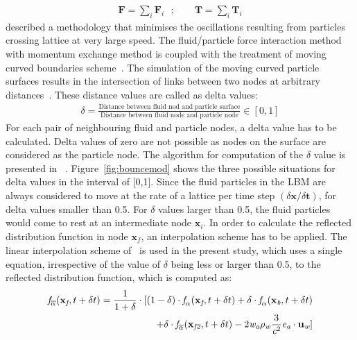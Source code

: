 \begin{align}
\mathbf{F} = \sum\limits_{\textit{i}}{\mathbf{F}_{\textit{i}}} \mbox{ }; \qquad \mathbf{T} = \sum\limits_{\textit{i}}{\mathbf{T}_{\textit{i}}}
\end{align}
\citet{Ladd2001} described a methodology that minimises the oscillations resulting from particles crossing lattice at very large speed. The fluid/particle force interaction method with momentum exchange method is coupled with the treatment of moving curved boundaries scheme~\citep{yu2002unified,yu2003viscous}. The simulation of the moving curved particle surfaces results in the intersection of links between two nodes at arbitrary distances~\citep{iglberger2008}. These distance values are called as delta values:
\begin{align}
\delta = \frac{\mbox{Distance between fluid nod and particle surface}}{\mbox{Distance between fluid node and particle node}} \in [0,1]
\end{align} 
For each pair of neighbouring fluid and particle nodes, a delta value has to be calculated. Delta values of zero are not possible as nodes on the surface are considered as the particle node. The algorithm for computation of the $\delta$ value is presented in ~\citet{iglberger2008}. Figure~\ref{fig:bouncemod} shows the three possible situations for delta values in the interval of [0,1]. Since the fluid particles in the LBM are always considered to move at the rate of a lattice per time step $(\delta \mathbf{x}/ \delta \mathbf{t})$, for delta values smaller than 0.5. For $\delta$ values larger than 0.5, the fluid particles would come to rest at an intermediate node $\mathbf{x}_{\textit{i}}$. In order to calculate the reflected distribution function in node $\mathbf{x}_{\textit{f}}$, an interpolation scheme has to be applied. The linear interpolation scheme of~\citet{yu2002unified, yu2003viscous} is used in the present study, which uses a single equation, irrespective of the value of $\delta$ being less or larger than 0.5, to the reflected distribution function, which is computed as:
\begin{align}
 \nonumber
\textit{\textit{f}}_{\overline{\alpha}}(\mathbf{x}_{\textit{f}},t + \delta t) = \frac{1}{1 + \delta} \cdot [(1-\delta)\cdot \textit{\textit{f}}_{\alpha}(\mathbf{x}_{\textit{f}},t + \delta t) + \delta \cdot \textit{\textit{f}}_{\alpha}(\mathbf{x}_{\textit{b}},t + \delta t)  \\
+ \delta \cdot \textit{\textit{f}}_{\overline{\alpha}}(\mathbf{x}_{\textit{f2}},t + \delta t) -2\textit{w}_{\textit{a}}\rho_{\textit{w}}\frac{3}{\textit{c}^{2}}\mathbf{\textit{e}}_{\textit{a}}\cdot \mathbf{u}_{\textit{w}}]
\end{align}
